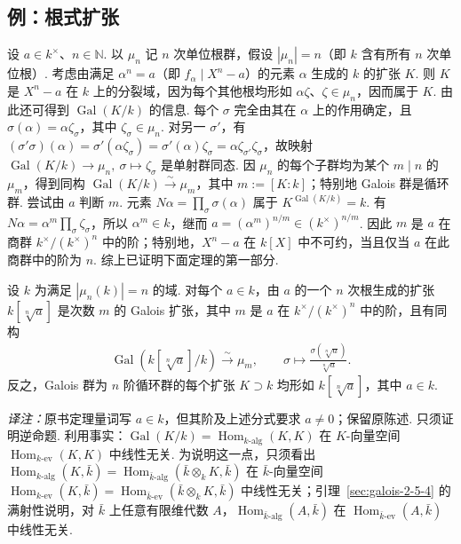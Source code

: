 \subsection{例：根式扩张}\label{sec:galois-2-7-5}
设 $a\in k^\times$、$n\in\mathbb N$. 以 $\mu_n$ 记 $n$ 次单位根群，假设 $|\mu_n|=n$（即 $k$ 含有所有 $n$ 次单位根）. 考虑由满足 $\alpha^n=a$（即 $f_\alpha\mid X^n-a$）的元素 $\alpha$ 生成的 $k$ 的扩张 $K$. 则 $K$ 是 $X^n-a$ 在 $k$ 上的分裂域，因为每个其他根均形如 $\alpha\zeta$、$\zeta\in\mu_n$，因而属于 $K$. 由此还可得到 $\operatorname{Gal}(K/k)$ 的信息. 每个 $\sigma$ 完全由其在 $\alpha$ 上的作用确定，且 $\sigma(\alpha)=\alpha\zeta_\sigma$，其中 $\zeta_\sigma\in\mu_n$. 对另一 $\sigma'$，有 $(\sigma'\sigma)(\alpha)=\sigma'(\alpha\zeta_\sigma)=\sigma'(\alpha)\zeta_\sigma=\alpha\zeta_{\sigma'}\zeta_\sigma$，故映射 $\operatorname{Gal}(K/k)\to\mu_n,\ \sigma\mapsto\zeta_\sigma$ 是单射群同态. 因 $\mu_n$ 的每个子群均为某个 $m\mid n$ 的 $\mu_m$，得到同构 $\operatorname{Gal}(K/k)\xrightarrow{\sim}\mu_m$，其中 $m:=[K:k]$；特别地 Galois 群是循环群.
尝试由 $a$ 判断 $m$. 元素 $N\alpha=\prod_\sigma\sigma(\alpha)$ 属于 $K^{\operatorname{Gal}(K/k)}=k$. 有 $N\alpha=\alpha^m\prod_\sigma\zeta_\sigma$，所以 $\alpha^m\in k$，继而 $a=(\alpha^m)^{n/m}\in(k^\times)^{n/m}$. 因此 $m$ 是 $a$ 在商群 $k^\times/(k^\times)^n$ 中的阶；特别地，$X^n-a$ 在 $k[X]$ 中不可约，当且仅当 $a$ 在此商群中的阶为 $n$. 综上已证明下面定理的第一部分.
\begin{theorem*}设 $k$ 为满足 $|\mu_n(k)|=n$ 的域. 对每个 $a\in k$，由 $a$ 的一个 $n$ 次根生成的扩张 $k[\sqrt[n]a]$ 是次数 $m$ 的 Galois 扩张，其中 $m$ 是 $a$ 在 $k^\times/(k^\times)^n$ 中的阶，且有同构
\begin{align*}
\operatorname{Gal}(k[\sqrt[n]a]/k)\xrightarrow{\sim}\mu_m,\qquad\sigma\mapsto\frac{\sigma(\sqrt[n]a)}{\sqrt[n]a}.
\end{align*}
反之，Galois 群为 $n$ 阶循环群的每个扩张 $K\supset k$ 均形如 $k[\sqrt[n]a]$，其中 $a\in k$.\end{theorem*}
\noindent\emph{译注：}原书定理量词写 $a\in k$，但其阶及上述分式要求 $a\ne0$；保留原陈述.
只须证明逆命题. 利用事实：$\operatorname{Gal}(K/k)=\operatorname{Hom}_{k\text{-alg}}(K,K)$ 在 $K$-向量空间 $\operatorname{Hom}_{k\text{-ev}}(K,K)$ 中线性无关. 为说明这一点，只须看出 $\operatorname{Hom}_{k\text{-alg}}(K,\bar k)=\operatorname{Hom}_{\bar k\text{-alg}}(\bar k\otimes_kK,\bar k)$ 在 $\bar k$-向量空间 $\operatorname{Hom}_{k\text{-ev}}(K,\bar k)=\operatorname{Hom}_{\bar k\text{-ev}}(\bar k\otimes_kK,\bar k)$ 中线性无关；引理~\ref{sec:galois-2-5-4} 的满射性说明，对 $\bar k$ 上任意有限维代数 $A$，$\operatorname{Hom}_{\bar k\text{-alg}}(A,\bar k)$ 在 $\operatorname{Hom}_{\bar k\text{-ev}}(A,\bar k)$ 中线性无关.
